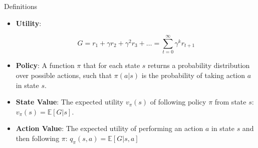 \documentclass[11pt]{beamer}
\begin{document}
\begin{frame}{Definitions}

\begin{itemize}
\item<1-> \textbf{Utility}: 

\vspace{-\baselineskip}

\[
G = r_1 + \gamma r_2 + \gamma^2 r_3 + \ldots = \sum_{t=0}^{\infty} \gamma^k r_{t+1}
\]

\item<2-> \textbf{Policy}: A function $\pi$ that for each state $s$ returns a probability distribution over possible actions, such that $\pi(a|s)$ is the probability of taking action $a$ in state $s$.

\item<3-> \textbf{State Value}: The expected utility $v_{\pi}(s)$ of following policy $\pi$ from state $s$: $v_{\pi}(s) = \mathbb{E}[G | s]$.

\item<4-> \textbf{Action Value}: The expected utility of performing an action $a$ in state $s$ and then following $\pi$: $q_{\pi}(s,a) = \mathbb{E}[G | s,a]$
\end{itemize}

\end{frame}
\end{document}

